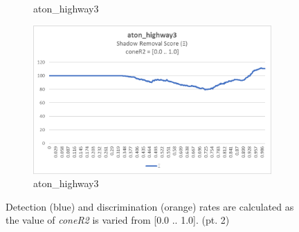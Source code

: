 \begin{appendices}
\begin{figure}
\begin{subfigure}{.45\linewidth}
  \caption{aton\_highway3}
\end{subfigure}
\hfill
\begin{subfigure}{.45\linewidth}
  \includegraphics[width=1\linewidth]{figures/appendix/highway3_coneR2_score.jpg}
  \caption{aton\_highway3}
\end{subfigure}

\caption{Detection (blue) and discrimination (orange) rates are calculated as the value of \textit{coneR2} is varied from [0.0 .. 1.0]. (pt. 2)}
\end{figure}


\end{appendices}
